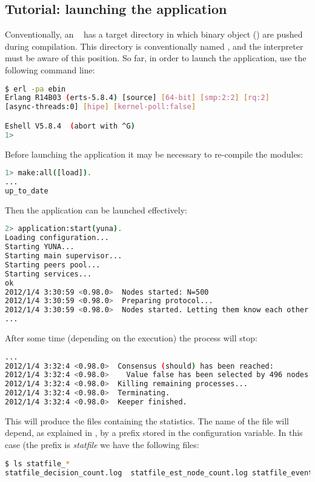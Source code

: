 \subsection{Tutorial: launching the application}

Conventionally, an \Erlang\  has a target directory
in which binary object () are pushed during compilation. This
directory is conventionally named , and the interpreter must be
aware of this position. So far, in order to launch the application, use
the following command line:
\begin{lstlisting}[language=bash]
$ erl -pa ebin
Erlang R14B03 (erts-5.8.4) [source] [64-bit] [smp:2:2] [rq:2]
[async-threads:0] [hipe] [kernel-poll:false]

Eshell V5.8.4  (abort with ^G)
1>
\end{lstlisting}

Before launching the application it may be necessary to re-compile the
modules:
\begin{lstlisting}[language=bash]
1> make:all([load]).
...
up_to_date
\end{lstlisting}

Then the application can be launched effectively:
\begin{lstlisting}[language=bash]
2> application:start(yuna).
Loading configuration...
Starting YUNA...
Starting main supervisor...
Starting peers pool...
Starting services...
ok
2012/1/4 3:30:59 <0.98.0>  Nodes started: N=500
2012/1/4 3:30:59 <0.98.0>  Preparing protocol...
2012/1/4 3:30:59 <0.98.0>  Nodes started. Letting them know each other...
...
\end{lstlisting}

After some time (depending on the execution) the process will stop:
\begin{lstlisting}[language=bash]
...
2012/1/4 3:32:4 <0.98.0>  Consensus (should) has been reached:
2012/1/4 3:32:4 <0.98.0>    Value false has been selected by 496 nodes
2012/1/4 3:32:4 <0.98.0>  Killing remaining processes...
2012/1/4 3:32:4 <0.98.0>  Terminating.
2012/1/4 3:32:4 <0.98.0>  Keeper finished.
\end{lstlisting}

This will produce the files containing the statistics. The name of the
file will depend, as explained in , by a
prefix stored in the configuration variable. In this case (the prefix is
\emph{statfile} we have the following files:
\begin{lstlisting}[language=bash]
$ ls statfile_*
statfile_decision_count.log  statfile_est_node_count.log statfile_events.log  statfile_node_count.log
\end{lstlisting}

